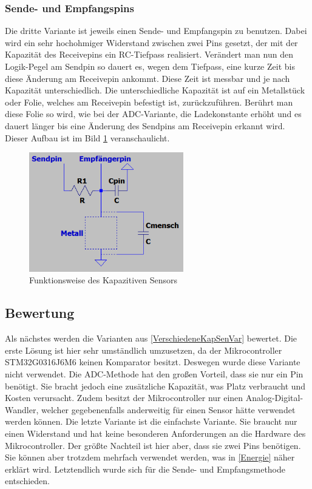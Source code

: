 \documentclass[a4paper,
DIV=13,
12pt,
BCOR=10mm,
department=FakEI,
parskip=half,
automark,
]{article}
\begin{document}
\subsubsection{Sende- und Empfangspins}
Die dritte Variante ist jeweils einen Sende- und Empfangspin zu benutzen. Dabei wird ein sehr hochohmiger Widerstand zwischen zwei Pins gesetzt, der mit der Kapazität des Receivepins ein RC-Tiefpass realisiert. Verändert man nun den Logik-Pegel am Sendpin so dauert es, wegen dem Tiefpass, eine kurze Zeit bis diese Änderung am Receivepin ankommt. Diese Zeit ist messbar und je nach Kapazität unterschiedlich. Die unterschiedliche Kapazität ist auf ein Metallstück oder Folie, welches am Receivepin befestigt ist, zurückzuführen. Berührt man diese Folie so wird, wie bei der ADC-Variante, die Ladekonstante erhöht und es dauert länger bis eine Änderung des Sendpins am Receivepin erkannt wird. Dieser Aufbau ist im Bild \ref{fig:KapSensor} veranschaulicht.

\begin{figure}[!hbpt]
 \begin{center} \includegraphics[width=0.6\textwidth]{KapazitiverSensor.png}
 \caption{Funktionsweise des Kapazitiven Sensors}
 \label{fig:KapSensor}
  \end{center}
\end{figure}

\subsection{Bewertung}
\label{Bewertung}
Als nächstes werden die Varianten aus \ref{VerschiedeneKapSenVar} bewertet. Die erste Lösung ist hier sehr umständlich umzusetzen, da der Mikrocontroller STM32G0316J6M6 keinen Komparator besitzt. Deswegen wurde diese Variante nicht verwendet. Die ADC-Methode hat den großen Vorteil, dass sie nur ein Pin benötigt. Sie bracht jedoch eine zusätzliche Kapazität, was Platz verbraucht und Kosten verursacht. Zudem besitzt der Mikrocontroller nur einen Analog-Digital-Wandler, welcher gegebenenfalls anderweitig für einen Sensor hätte verwendet werden können. Die letzte Variante ist die einfachste Variante. Sie braucht nur einen Widerstand und hat keine besonderen Anforderungen an die Hardware des Mikrocontroller. Der größte Nachteil ist hier aber, dass sie zwei Pins benötigen. Sie können aber trotzdem mehrfach verwendet werden, was in \ref{Energie} näher erklärt wird. Letztendlich wurde sich für die Sende- und Empfangsmethode entschieden.
\end{document}
